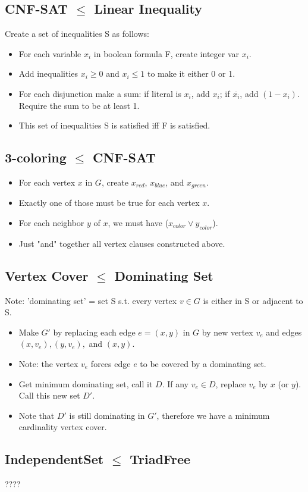 \documentclass[12pt]{article}
\providecommand{\reducible}[2]{
  \textbf{#1} $\leq$ \textbf{#2}
}
\begin{document}
\subsection{\reducible{CNF-SAT}{Linear Inequality}}
Create a set of inequalities S as follows:\\
\begin{itemize}
  \item For each variable $x_i$ in boolean formula F, create integer var $x_i$.
  \item Add inequalities $x_i \geq 0$ and $x_i \leq 1$ to make it either 0 or 1.
  \item For each disjunction make a sum: if literal is $x_i$, add $x_i$; if $\overline{x_i}$, add $(1-x_i)$. Require the sum to be at least 1.
  \item This set of inequalities S is satisfied iff F is satisfied.
\end{itemize}

\subsection{\reducible{3-coloring}{CNF-SAT}}
\begin{itemize}
  \item For each vertex $x$ in $G$, create $x_{red}$, $x_{blue}$, and $x_{green}$.
  \item Exactly one of those must be true for each vertex $x$.
  \item For each neighbor $y$ of $x$, we must have ($x_{color} \lor y_{color}$).
  \item Just "and" together all vertex clauses constructed above.
\end{itemize}

\subsection{\reducible{Vertex Cover}{Dominating Set}}
Note: 'dominating set' = set S s.t. every vertex $v \in G$ is either in S or adjacent to S.
\begin{itemize}
  \item Make $G'$ by replacing each edge $e = (x,y)$ in $G$ by new vertex $v_e$ and edges $(x,v_e),(y,v_e),$ and $(x,y)$.
  \item Note: the vertex $v_e$ forces edge $e$ to be covered by a dominating set.
  \item Get minimum dominating set, call it $D$. If any $v_e \in D$, replace $v_e$ by $x$ (or $y$). Call this new set $D'$.
  \item Note that $D'$ is still dominating in $G'$, therefore we have a minimum cardinality vertex cover.
\end{itemize}


\subsection{\reducible{IndependentSet}{TriadFree}}
????
\end{document}
